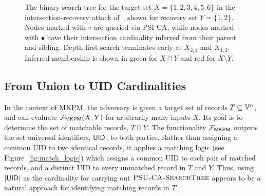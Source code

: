 \begin{figure}
  \centering
  {	
    \newcommand{\pos}[1]{\raisebox{.9pt}{#1}}
    \newcommand{\fullcirc}{\position{\tikz{\draw[line width=.5pt, color=black, fill=black] circle(1.1pt);}}}
    \newcommand{\ocirc}{\position{\tikz[]{\draw[line width=.5pt, color=black, fill=none] circle(1.1pt);}}}

    \caption{
      The binary search tree for the target set $X=\{1,2,3,4,5,6\}$ in the intersection-recovery attack of~\cite{USENIX:GHLWJL22}, shown for recovery set \(Y=\{1,2\}\). Nodes marked with $\circ$ are queried via PSI-CA, while nodes marked with $\bullet$ have their intersection cardinality inferred from their parent and sibling. Depth first search terminates early at \(X_{2,1}\) and \(X_{1,2}\). Inferred membership is shown in {\color{positive} green} for $X\cap Y$ and {\color{negative} red} for $X\setminus Y$.}
    \label{fig:guo_basline_tree}
  }
\end{figure}

\subsection{From Union to UID Cardinalities}
In the context of MKPM,
the adversary is given a target set of records $T \subseteq \Ispace{}^n$, and
can evaluate $\mathcal{F}_{\mathsf{MKPM}}(X; Y)$ for arbitrarily many inputs $X$. Its goal is
to determine the set of matchable records, $T \sqcap Y$. The functionality
$\mathcal F_{\mathsf{MKPM}}$ outputs the set universal identifiers, $\mathsf{UID}$, to both
parties. Rather than assigning a common UID to two identical records, it applies
a matching logic (see Figure~\ref{fig:match_logic}) which assigns a common UID
to each pair of matched records, and a distinct UID to every unmatched record in
$T$ and $Y$. Thus, using $|\mathsf{UID}|$ as the cardinality for carrying out
$\textsc{PSU\mbox{-}CA\mbox{-}SearchTree}{}$ appears to be a natural approach for identifying matching
records in $T$.

